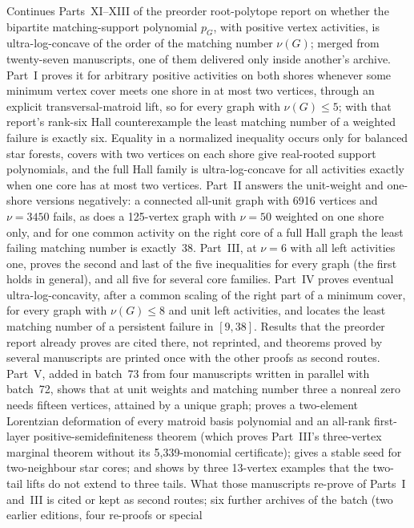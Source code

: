 \documentclass[11pt]{article}
\begin{document}
{Continues Parts~XI--XIII of the preorder root-polytope report on whether the
bipartite matching-support polynomial $p_G$, with positive vertex
activities, is ultra-log-concave of the order of the matching number
$\nu(G)$; merged from twenty-seven manuscripts, one of them delivered only
inside another's archive.  Part~I proves it for arbitrary positive
activities on both shores whenever some minimum vertex cover meets one shore
in at most two vertices, through an explicit transversal-matroid lift, so for
every graph with $\nu(G)\le5$; with that report's rank-six Hall
counterexample the least matching number of a weighted failure is exactly
six.  Equality in a normalized inequality occurs only for balanced star
forests, covers with two vertices on each shore give real-rooted support
polynomials, and the full Hall family is ultra-log-concave for all
activities exactly when one core has at most two vertices.  Part~II answers
the unit-weight and one-shore versions negatively: a connected all-unit graph
with 6916 vertices and $\nu=3450$ fails, as does a 125-vertex graph with
$\nu=50$ weighted on one shore only, and for one common activity on the right
core of a full Hall graph the least failing matching number is exactly~38.
Part~III, at $\nu=6$ with all left activities one, proves the second and last
of the five inequalities for every graph (the first holds in general), and
all five for several core families.  Part~IV proves eventual
ultra-log-concavity, after a common scaling of the right part of a minimum
cover, for every graph with $\nu(G)\le8$ and unit left activities, and
locates the least matching number of a persistent failure in $[9,38]$.
Results that the preorder report already proves are cited there, not
reprinted, and theorems proved by several manuscripts are printed once with
the other proofs as second routes.  Part~V, added in batch~73 from four
manuscripts written in parallel with batch~72, shows that at unit weights and
matching number three a nonreal zero needs fifteen vertices, attained by a
unique graph; proves a two-element Lorentzian deformation of every matroid
basis polynomial and an all-rank first-layer positive-semidefiniteness
theorem (which proves Part~III's three-vertex marginal theorem without its
5{,}339-monomial certificate); gives a stable seed for
two-neighbour star cores; and shows by three 13-vertex examples that the
two-tail lifts do not extend to three tails.  What those manuscripts
re-prove of Parts~I and~III is cited or kept as second routes; six further
archives of the batch (two earlier editions, four re-proofs or special
}
\end{document}
